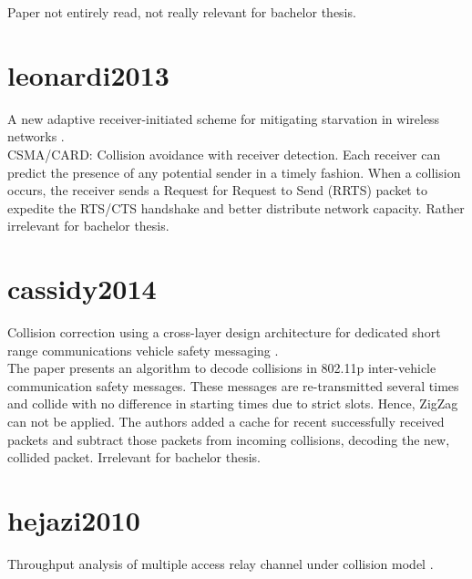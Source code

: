 Paper not entirely read, not really relevant for bachelor thesis.



\section*{leonardi2013}

A new adaptive receiver-initiated scheme for mitigating starvation in wireless networks \cite{leonardi2013}.\\

CSMA/CARD: Collision avoidance with receiver detection. Each receiver can predict the presence of any potential sender in a timely fashion. When a collision occurs, the receiver sends a Request for Request to Send (RRTS) packet to expedite the RTS/CTS handshake and better distribute network capacity. Rather irrelevant for bachelor thesis.



\section*{cassidy2014}

Collision correction using a cross-layer design architecture for dedicated short range communications vehicle safety messaging \cite{cassidy2014}.\\

The paper presents an algorithm to decode collisions in 802.11p inter-vehicle communication safety messages. These messages are re-transmitted several times and collide with no difference in starting times due to strict slots. Hence, ZigZag can not be applied. The authors added a cache for recent successfully received packets and subtract those packets from incoming collisions, decoding the new, collided packet. Irrelevant for bachelor thesis.



\section*{hejazi2010}

Throughput analysis of multiple access relay channel under collision model \cite{hejazi2010}.\\

